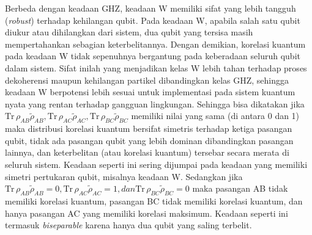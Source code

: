Berbeda dengan keadaan GHZ, keadaan W memiliki sifat yang lebih tangguh (\textit{robust}) terhadap kehilangan qubit. Pada keadaan W, apabila salah satu qubit diukur atau dihilangkan dari sistem, dua qubit yang tersisa masih mempertahankan sebagian keterbelitannya. Dengan demikian, korelasi kuantum pada keadaan W tidak sepenuhnya bergantung pada keberadaan seluruh qubit dalam sistem. Sifat inilah yang menjadikan kelas W lebih tahan terhadap proses dekoherensi maupun kehilangan partikel dibandingkan kelas GHZ, sehingga keadaan W berpotensi lebih sesuai untuk implementasi pada sistem kuantum nyata yang rentan terhadap gangguan lingkungan. Sehingga bisa dikatakan jika $\mathrm{Tr}\,\rho_{AB} \tilde{\rho}_{AB}, \mathrm{Tr}\,\rho_{AC} \tilde{\rho}_{AC}, \mathrm{Tr}\,\rho_{BC} \tilde{\rho}_{BC}$ memiliki nilai yang sama (di antara 0 dan 1) maka distribusi korelasi kuantum bersifat simetris terhadap ketiga pasangan qubit, tidak ada pasangan qubit yang lebih dominan dibandingkan pasangan lainnya, dan keterbelitan (atau korelasi kuantum) tersebar secara merata di seluruh sistem. Keadaan seperti ini sering dijumpai pada keadaan yang memiliki simetri pertukaran qubit, misalnya keadaan W. Sedangkan jika $\mathrm{Tr}\,\rho_{AB} \tilde{\rho}_{AB}=0, \mathrm{Tr}\,\rho_{AC} \tilde{\rho}_{AC}=1, dan \mathrm{Tr}\,\rho_{BC} \tilde{\rho}_{BC}=0$ maka pasangan AB tidak memiliki korelasi kuantum,
pasangan BC tidak memiliki korelasi kuantum, dan
hanya pasangan AC yang memiliki korelasi maksimum. Keadaan seperti ini termasuk \textit{biseparable} karena hanya dua qubit yang saling terbelit.








